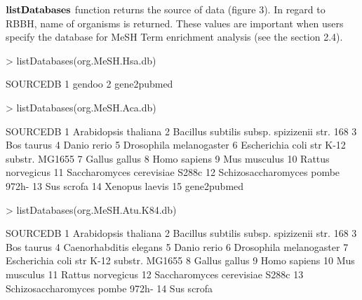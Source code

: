\documentclass[11pt]{article}
\begin{document}
$\bf{listDatabases}$ function returns the source of data (figure 3). In regard to RBBH, name of organisms is returned. These values are important when users specify the database for MeSH Term enrichment analysis (see the section 2.4).

\begin{center}
\begin{Schunk}
\begin{Sinput}
> listDatabases(org.MeSH.Hsa.db)
\end{Sinput}
\begin{Soutput}
     SOURCEDB
1      gendoo
2 gene2pubmed
\end{Soutput}
\begin{Sinput}
> listDatabases(org.MeSH.Aca.db)
\end{Sinput}
\begin{Soutput}
                                       SOURCEDB
1                          Arabidopsis thaliana
2  Bacillus subtilis subsp. spizizenii str. 168
3                                    Bos taurus
4                                   Danio rerio
5                       Drosophila melanogaster
6      Escherichia coli str K-12 substr. MG1655
7                                 Gallus gallus
8                                  Homo sapiens
9                                  Mus musculus
10                            Rattus norvegicus
11               Saccharomyces cerevisiae S288c
12              Schizosaccharomyces pombe 972h-
13                                   Sus scrofa
14                               Xenopus laevis
15                                  gene2pubmed
\end{Soutput}
\begin{Sinput}
> listDatabases(org.MeSH.Atu.K84.db)
\end{Sinput}
\begin{Soutput}
                                       SOURCEDB
1                          Arabidopsis thaliana
2  Bacillus subtilis subsp. spizizenii str. 168
3                                    Bos taurus
4                        Caenorhabditis elegans
5                                   Danio rerio
6                       Drosophila melanogaster
7      Escherichia coli str K-12 substr. MG1655
8                                 Gallus gallus
9                                  Homo sapiens
10                                 Mus musculus
11                            Rattus norvegicus
12               Saccharomyces cerevisiae S288c
13              Schizosaccharomyces pombe 972h-
14                                   Sus scrofa

\end{Soutput}
\end{Schunk}
\end{center}
\end{document}
